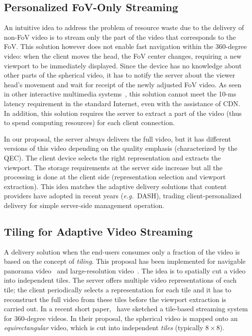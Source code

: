 \subsection{Personalized FoV-Only Streaming}

An intuitive idea to address the problem of resource waste due to the
delivery of non-FoV video is to stream only the part of the video that
corresponds to the \ac{FoV}. This solution however does not enable
fast navigation within the 360-degree video: when the client moves the
head, the FoV center changes, requiring a new viewport to be
immediately displayed. Since the device has no knowledge about other
parts of the spherical video, it has to notify the server about the
viewer head's movement and wait for receipt of the newly adjusted FoV
video. As seen in other interactive multimedia
systems~\cite{ChoyWSR14}, this solution cannot meet the 10-ms latency
requirement in the standard Internet, even with the assistance of
\ac{CDN}. In addition, this solution requires the server to extract a
part of the video (thus to spend computing resources) for each client
connection.

 In our proposal, the server always delivers
the full video, but it has different versions of this video depending
on the quality emphasis (characterized by the QEC). The client device
selects the right representation and extracts the viewport. The
storage requirements at the server side increase but all the
processing is done at the client side (representation selection and
viewport extraction). This idea matches the adaptive delivery
solutions that content providers have adopted in recent years
(\textit{e.g.}~\ac{DASH}), trading client-personalized delivery for
simple server-side management operation.

\subsection{Tiling for Adaptive Video Streaming}

A delivery solution when the end-users consumes only a fraction of the
video is based on the concept of \emph{tiling}. This proposal has been
implemented for navigable panorama
video~\cite{sanchez_compressed_2015,wang_mixing_2014,gaddam_tiling_2015}
and large-resolution video~\cite{jean16mmsys}. The idea is to
spatially cut a video into independent tiles. The server offers
multiple video representations of each tile; the client periodically
selects a representation for each tile and it has to reconstruct the
full video from these tiles before the viewport extraction is carried
out. In a recent short paper,~\citet{ochi_live_2015} have sketched a
tile-based streaming system for 360-degree videos. In their proposal,
the spherical video is mapped onto an \emph{equirectangular} video,
which is cut into independent \emph{tiles} (typically $8\times 8$).

